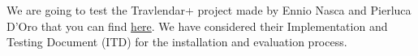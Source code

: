 We are going to test the Travlendar+ project made by Ennio Nasca and Pierluca D'Oro that you can find \href{https://github.com/ennnas/DoroNasca}{here}. We have considered their Implementation and Testing Document (ITD) for the installation and evaluation process.